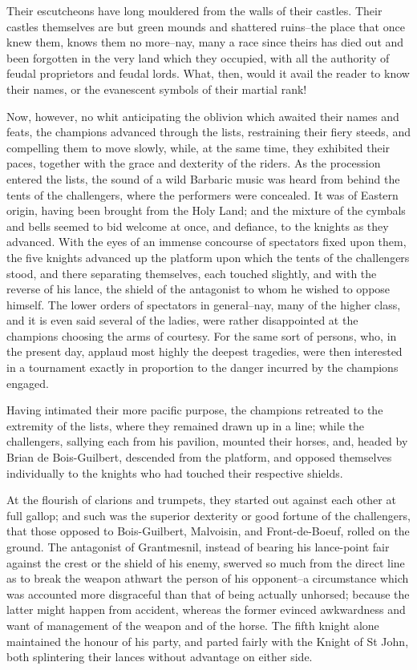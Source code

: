 Their escutcheons have long mouldered from the walls of their castles.
Their castles themselves are but green mounds and shattered ruins--the
place that once knew them, knows them no more--nay, many a race since
theirs has died out and been forgotten in the very land which they
occupied, with all the authority of feudal proprietors and feudal lords.
What, then, would it avail the reader to know their names, or the
evanescent symbols of their martial rank!

Now, however, no whit anticipating the oblivion which awaited their
names and feats, the champions advanced through the lists, restraining
their fiery steeds, and compelling them to move slowly, while, at the
same time, they exhibited their paces, together with the grace and
dexterity of the riders. As the procession entered the lists, the sound
of a wild Barbaric music was heard from behind the tents of the
challengers, where the performers were concealed. It was of Eastern
origin, having been brought from the Holy Land; and the mixture of the
cymbals and bells seemed to bid welcome at once, and defiance, to the
knights as they advanced. With the eyes of an immense concourse of
spectators fixed upon them, the five knights advanced up the platform
upon which the tents of the challengers stood, and there separating
themselves, each touched slightly, and with the reverse of his lance,
the shield of the antagonist to whom he wished to oppose himself. The
lower orders of spectators in general--nay, many of the higher class,
and it is even said several of the ladies, were rather disappointed at
the champions choosing the arms of courtesy. For the same sort of
persons, who, in the present day, applaud most highly the deepest
tragedies, were then interested in a tournament exactly in proportion to
the danger incurred by the champions engaged.

Having intimated their more pacific purpose, the champions retreated to
the extremity of the lists, where they remained drawn up in a line;
while the challengers, sallying each from his pavilion, mounted their
horses, and, headed by Brian de Bois-Guilbert, descended from the
platform, and opposed themselves individually to the knights who had
touched their respective shields.

At the flourish of clarions and trumpets, they started out against each
other at full gallop; and such was the superior dexterity or good
fortune of the challengers, that those opposed to Bois-Guilbert,
Malvoisin, and Front-de-Boeuf, rolled on the ground. The antagonist of
Grantmesnil, instead of bearing his lance-point fair against the crest
or the shield of his enemy, swerved so much from the direct line as to
break the weapon athwart the person of his opponent--a circumstance
which was accounted more disgraceful than that of being actually
unhorsed; because the latter might happen from accident, whereas the
former evinced awkwardness and want of management of the weapon and of
the horse. The fifth knight alone maintained the honour of his party,
and parted fairly with the Knight of St John, both splintering their
lances without advantage on either side.

